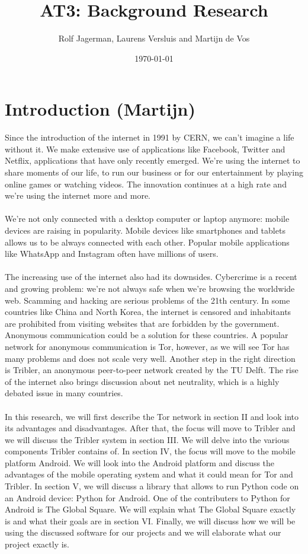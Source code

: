 \documentclass[11pt]{article}
\title{AT3: Background Research}
\author{Rolf Jagerman, Laurens Versluis and Martijn de Vos}
\date{\today}
\begin{document}
\maketitle

\pagebreak

\section{Introduction (Martijn)}
Since the introduction of the internet in 1991 by CERN, we can't imagine a life without it. We make extensive use of applications like Facebook, Twitter and Netflix, applications that have only recently emerged. We're using the internet to share moments of our life, to run our business or for our entertainment by playing online games or watching videos. The innovation continues at a high rate and we're using the internet more and more.\\\\
We're not only connected with a desktop computer or laptop anymore: mobile devices are raising in popularity. Mobile devices like smartphones and tablets allows us to be always connected with each other. Popular mobile applications like WhatsApp and Instagram often have millions of users.\\\\
The increasing use of the internet also had its downsides. Cybercrime is a recent and growing problem: we're not always safe when we're browsing the worldwide web. Scamming and hacking are serious problems of the 21th century. In some countries like China and North Korea, the internet is censored and inhabitants are prohibited from visiting websites that are forbidden by the government. Anonymous communication could be a solution for these countries. A popular network for anonymous communication is Tor, however, as we will see Tor has many problems and does not scale very well. Another step in the right direction is Tribler, an anonymous peer-to-peer network created by the TU Delft. The rise of the internet also brings discussion about net neutrality, which is a highly debated issue in many countries.\\\\
In this research, we will first describe the Tor network in section II and look into its advantages and disadvantages. After that, the focus will move to Tribler and we will discuss the Tribler system in section III. We will delve into the various components Tribler contains of. In section IV, the focus will move to the mobile platform Android. We will look into the Android platform and discuss the advantages of the mobile operating system and what it could mean for Tor and Tribler. In section V, we will discuss a library that allows to run Python code on an Android device: Python for Android. One of the contributers to Python for Android is The Global Square. We will explain what The Global Square exactly is and what their goals are in section VI. Finally, we will discuss how we will be using the discussed software for our projects and we will elaborate what our project exactly is.
\end{document}
